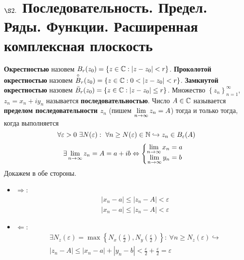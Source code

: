 \section{$\S 2.$ Последовательность. Предел. Ряды. Функции. Расширенная
  комплексная плоскость}
\Def
\textbf{Окрестностью} назовем $B_r(z_0) = \left\{ z \in \mathbb{C}: \left| z-z_0
    \right| < r \right\}$. \textbf{Проколотой окрестностью} назовем
$\overset{\circ}{B}_r(z_0) = \left\{ z \in \mathbb{C}: 0 < \left| z-z_0 \right| < r
\right\}$. \textbf{Замкнутой окрестностью} назовем $\bar{B}_r(z_0) = \left\{ z
    \in \mathbb{C}: \left| z-z_0\right| \leq r \right\}$.
\Def
Множество $\left\{ z_n \right\}_{n=1}^\infty$, $z_n  = x_n + iy_n$ называется
\textbf{последовательностью}.
\Def
Число $A \in \mathbb{C}$ называется \textbf{пределом последовательности $z_n$} (пишем
$\displaystyle \lim_{n \to \infty}z_n = A$) тогда и только тогда, когда выполняется
\begin{equation}\label{(2.1)}
    \forall \varepsilon > 0 \ \exists N(\varepsilon):\ \forall n \geq N(\varepsilon)\in \mathbb{N} \hookrightarrow z_n \in B_{\varepsilon}(A)
\end{equation}
\asm
\begin{align*}
  & \exists \lim_{n \to \infty}z_n = A = a+ib \Leftrightarrow \left\{ \begin{matrix}
          \displaystyle \lim_{n \to \infty}x_n = a \\
          \displaystyle \lim_{n \to \infty}y_n = b
      \end{matrix} \right.
\end{align*}
\pr Докажем в обе стороны.
\begin{itemize}
    \item $\Rightarrow$:
    \begin{align*}
      & \left| x_n - a \right| \leq \left| z_n - A \right| < \varepsilon
    \end{align*}
    \begin{align*}
      & \left| x_n - a \right| \leq \left| z_n - A \right| < \varepsilon
    \end{align*}
    \item $\Leftarrow$:
    \begin{align*}
      & \exists N_z(\varepsilon) = \max\left\{ N_x\left( \frac{\varepsilon}{2} \right), N_y\left( \frac{\varepsilon}{2} \right) \right\}: \ \forall n \geq N_z(\varepsilon) \hookrightarrow \\
      & \left| z_n-A \right|\leq \left| x_n-a \right|+\left| y_n-b \right| < \frac{\varepsilon}{2} +\frac{\varepsilon}{2} = \varepsilon
    \end{align*}
\end{itemize}
